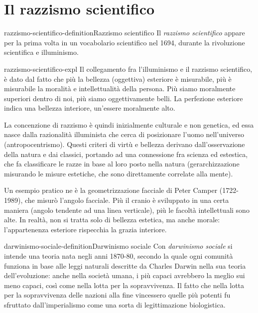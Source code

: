 \documentclass[preview]{standalone}
\begin{document}
\section{Il razzismo scientifico}

\begin{snippetdefinition}{razzismo-scientifico-definition}{Razzismo scientifico}
    Il \textit{razzismo scientifico} appare per la prima volta in un vocabolario scientifico nel 1694,
    durante la rivoluzione scientifica e illuminismo.
\end{snippetdefinition}

\begin{snippet}{razzismo-scientifico-expl}
    Il collegamento fra l'illuminismo e il razzismo scientifico, è dato dal fatto che più
    la bellezza (oggettiva) esteriore è misurabile, più è misurabile la moralità e intellettualità della persona.
    Più siamo moralmente superiori dentro di noi, più siamo oggettivamente belli.
    La perfezione esteriore indica una bellezza interiore, un'essere moralmente alto.
    
    La concenzione di razzismo è quindi inizialmente culturale e non genetica,
    ed essa nasce dalla razionalità illuminista che cerca di posizionare l'uomo nell'universo (antropocentrismo).
    Questi criteri di virtù e bellezza derivano dall'osservazione della natura e dai classici,
    portando ad una connessione fra scienza ed estestica, che fa classificare le razze
    in base al loro posto nella natura (gerarchizzazione misurando le misure estetiche, che
    sono direttamente correlate alla mente).
    
    Un esempio pratico ne è la geometrizzazione facciale di Peter Camper (1722-1989),
    che misurò l'angolo facciale. Più il cranio è sviluppato in una certa maniera (angolo tendente ad una linea verticale),
    più le facoltà intellettuali sono alte. In realtà, non si
    tratta solo di bellezza estetica, ma anche morale: l'appartenenza esteriore rispecchia
    la grazia interiore.
\end{snippet}

\begin{snippetdefinition}{darwinismo-sociale-definition}{Darwinismo sociale}
    Con \textit{darwinismo sociale} si intende una teoria nata negli anni 1870-80, secondo la quale ogni comunità
    funziona in base alle leggi naturali descritte da Charles Darwin nella sua teoria
    dell'evoluzione: anche nella società umana, i più capaci avrebbero la meglio sui meno
    capaci, così come nella lotta per la sopravvivenza. Il fatto che nella lotta per la sopravvivenza
    delle nazioni alla fine vincessero quelle più potenti fu sfruttato dall'imperialismo come una
    sorta di legittimazione biologistica.
\end{snippetdefinition}
\end{document}
